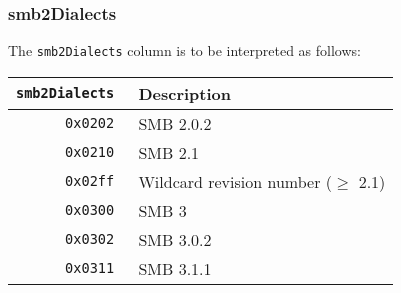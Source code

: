 \documentclass[documentation]{subfiles}
\begin{document}
\subsubsection{smb2Dialects}\label{smb2Dialects}
The {\tt smb2Dialects} column is to be interpreted as follows:

\begin{longtable}{>{\tt}rl}
    \toprule
    {\bf smb2Dialects} & {\bf Description}\\
    \midrule\endhead%
    0x0202 & SMB 2.0.2\\
    0x0210 & SMB 2.1\\
    0x02ff & Wildcard revision number ($\geq$ 2.1)\\
    0x0300 & SMB 3\\
    0x0302 & SMB 3.0.2\\
    0x0311 & SMB 3.1.1\\
    \bottomrule
\end{longtable}
\end{document}
